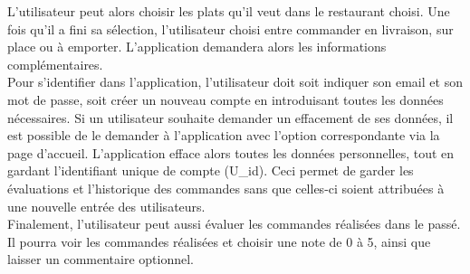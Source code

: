 \documentclass[10pt, a4paper]{article}
\begin{document}
L'utilisateur peut alors choisir les plats qu'il veut dans le restaurant choisi. Une fois qu'il a fini sa sélection, l'utilisateur 
choisi entre commander en livraison, sur place ou à emporter. L'application demandera alors les informations complémentaires. \\

Pour s'identifier dans l'application, l'utilisateur doit soit indiquer son email et son mot de passe, soit créer un nouveau 
compte en introduisant toutes les données nécessaires. Si un utilisateur souhaite demander un effacement de ses données,
il est possible de le demander à l'application avec l'option correspondante via la page d'accueil. L'application efface 
alors toutes les données personnelles, tout en gardant l'identifiant unique de compte (U\_id). Ceci permet de garder les évaluations 
et l'historique des commandes sans que celles-ci soient attribuées à une nouvelle entrée des utilisateurs. \\

Finalement, l'utilisateur peut aussi évaluer les commandes réalisées dans le passé. Il pourra voir les commandes réalisées 
et choisir une note de 0 à 5, ainsi que laisser un commentaire optionnel.
\end{document}
